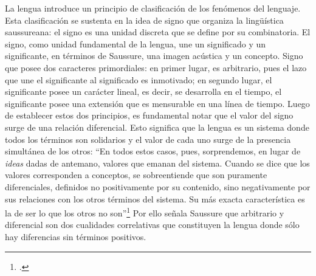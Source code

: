 La lengua introduce un principio de clasificación de los fenómenos del lenguaje. Esta clasificación se sustenta en la idea de signo que organiza la lingüística saussureana: el signo es una unidad discreta que se define por su combinatoria. El signo, como unidad fundamental de la lengua, une un significado y un significante, en términos de Saussure, una imagen acústica y un concepto. Signo que posee dos caracteres primordiales: en primer lugar, es arbitrario, pues el lazo que une el significante al significado es inmotivado; en segundo lugar, el significante posee un carácter lineal, es decir, se desarrolla en el tiempo, el significante posee una extensión que es mensurable en una línea de tiempo. Luego de establecer estos dos principios, es fundamental notar que el valor del signo surge de una relación diferencial. Esto significa que la lengua es un sistema donde todos los términos son solidarios y el valor de cada uno surge de la presencia simultánea de los otros: \enquote{En todos estos casos, pues, sorprendemos, en lugar de \emph{ideas} dadas de antemano, valores que emanan del sistema. Cuando se dice que los valores corresponden a conceptos, se sobreentiende que son puramente diferenciales, definidos no positivamente por su contenido, sino negativamente por sus relaciones con los otros términos del sistema. Su más exacta característica es la de ser lo que los otros no son}\footcite[141]{@6968-SAUSSURE1945} Por ello señala Saussure que arbitrario y diferencial son dos cualidades correlativas que constituyen la lengua donde sólo hay diferencias sin términos positivos.

